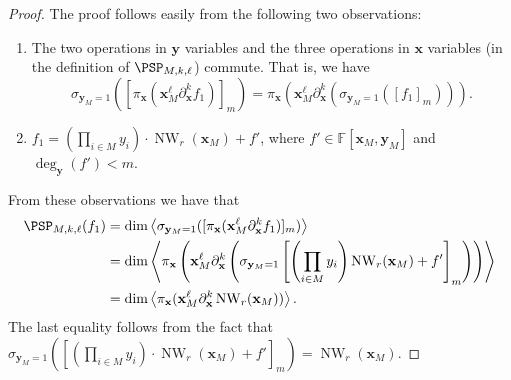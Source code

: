 \begin{proof}
The proof follows easily from the following two observations:
\begin{enumerate}
\item The two operations in $\mathbf y$ variables and the three operations in $\mathbf x$ variables (in the definition of $\PSP_{M,k,\ell}$) commute. That is, we have
\[
\sigma_{\mathbf y_M=1}([\pi_{\mathbf x}(\mathbf x_M^\ell\partial_{\mathbf x}^kf_1)]_m)
=\pi_{\mathbf x}(\mathbf x_M^\ell\partial_{\mathbf x}^k(\sigma_{\mathbf y_M=1}([f_1]_m))).
\]
\item $f_1=(\prod_{i\in M}y_i)\cdot\operatorname{NW}_r(\mathbf x_M)+f'$, where $f'\in\mathbb F[\mathbf x_M,\mathbf y_M]$ and $\deg_{\mathbf y}(f')<m$.
\end{enumerate}
From these observations we have that
\begin{align*}
\PSP_{M,k,\ell}(f_1)
&=\dim\left\langle\sigma_{\mathbf y_M=1}([\pi_{\mathbf x}(\mathbf x_M^\ell\partial_{\mathbf x}^kf_1)]_m)\right\rangle\\
&=\dim\left\langle\pi_{\mathbf x}\left(\mathbf x_M^\ell\partial_{\mathbf x}^k
\left(\sigma_{\mathbf y_M=1}\left[\left(\prod_{i\in M}y_i\right)\operatorname{NW}_r(\mathbf x_M)+f'\right]_m\right)\right)\right\rangle\\
&=\dim\left\langle\pi_{\mathbf x}(\mathbf x_M^\ell\partial_{\mathbf x}^k\operatorname{NW}_r(\mathbf x_M))\right\rangle.
\end{align*}
The last equality follows from the fact that
$\sigma_{\mathbf y_M=1}([(\prod_{i\in M}y_i)\cdot\operatorname{NW}_r(\mathbf x_M)+f']_m)=\operatorname{NW}_r(\mathbf x_M)$.
\end{proof}
